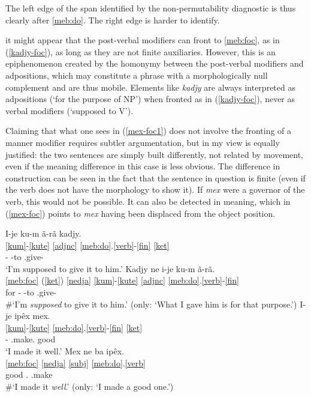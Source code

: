 \documentclass[output=paper]{langscibook}
\begin{document}
The left edge of the span identified by the non-permutability diagnostic is thus clearly after \ref{meb:do}. The right edge is harder to identify.

 it might appear that the post-verbal modifiers can front to \ref{meb:foc}, as in (\ref{kadjy-foc}), as long as they are not finite auxiliaries. However, this is an epiphenomenon created by the homonymy between the post-verbal modifiers and adpositions, which may constitute a phrase with a morphologically null complement and are thus mobile. Elements like {\em kadjy} are always interpreted as adpositions (`for the purpose of NP') when fronted as in (\ref{kadjy-foc}), never as verbal modifiers (`supposed to V').

\largerpage
Claiming that what one sees in (\ref{mex-foc1}) does not involve the fronting of a manner modifier requires subtler argumentation, but in my view is equally justified: the two sentences are simply built differently, not related by movement, even if the meaning difference in this case is less obvious. The difference in construction can be seen in the fact that the sentence in question is finite (even if the verb does not have the morphology to show it). If {\em mex} were a governor of the verb, this would not be possible. It can also be detected in meaning, which in (\ref{mex-foc}) points to {\em mex} having been displaced from the object position.

\ea
    \ea\glll I-je ku-m ã-rã kadjy.\\
         \ref{kum}-\ref{kute} \ref{adjnc} \ref{meb:do}.\ref{verb}-\ref{fin} \ref{ket}\\
         \First-\Erg{} \Third\Acc-to \Third.give-\Nfin{} \Prosp\\
      \glt `I'm supposed to give it to him.'
    \ex\label{kadjy-foc}\glll Kadjy ne i-je ku-m ã-rã.\\
         {\ref{meb:foc} (\ref{ket})} \ref{nedja} \ref{kum}-\ref{kute} \ref{adjnc} \ref{meb:do}.\ref{verb}-\ref{fin}\\
         for \Nfut{} \First-\Erg{} \Third\Acc-to \Third.give-\Nfin\\
      \glt \#`I'm {\em supposed} to give it to him.' (only: `What I gave him is for that purpose.')
  \z
    \ex \label{mex-foc1}
    \ea\glll I-je ipêx mex.\\
         \ref{kum}-\ref{kute} \ref{meb:do}.\ref{verb}-\ref{fin} \ref{ket}\\
         \First-\Erg{} \Third.make.\Nfin{} good\\
      \glt `I made it well.'
    \ex\label{mex-foc}\glll Mex ne ba ipêx.\\
                \ref{meb:foc} \ref{nedja} \ref{subj} \ref{meb:do}.\ref{verb}\\
                good \Nfut{} \First.\Nom{} \Third.make\\
              \glt \#`I made it {\em well}.' (only: `I made a good one.')
  \z
\z
\end{document}
